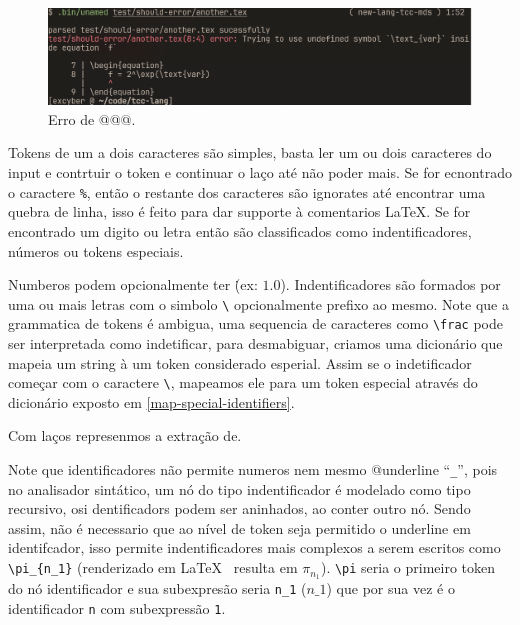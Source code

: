 \begin{figure}[H]
    \caption{\label{error-undefined-symbol} \small Erro de @@@.}
    \begin{center}
        \includegraphics[scale=0.5]{./Imagens/error-undefined-symbol.png}
    \end{center}
\end{figure}

Tokens de um a dois caracteres são simples, basta ler um ou dois caracteres do input e contrtuir o token e continuar o laço até não poder mais. Se for ecnontrado o caractere \texttt{\%}, então o restante dos caracteres são ignorates até encontrar uma quebra de linha, isso é feito para dar supporte à comentarios \LaTeX{}.
Se for encontrado um digito ou letra então são classificados como indentificadores, números ou tokens especiais.

Numberos podem opcionalmente ter \. (ex: $1.0$). Indentificadores são formados por uma ou mais letras com o simbolo \verb"\" opcionalmente prefixo ao mesmo. Note que a grammatica de tokens é ambigua, uma sequencia de caracteres como \verb"\frac" pode ser interpretada como indetificar, para desmabiguar, criamos uma dicionário que mapeia um string à um token considerado esperial. Assim se o indetificador começar com o caractere \verb"\", mapeamos ele para um token especial através do dicionário exposto em \autoref{map-special-identifiers}.

Com laços represenmos a extração de.

Note que identificadores não permite numeros nem mesmo @underline ``\verb|_|'', pois  no analisador sintático, um nó do tipo indentificador é modelado como tipo recursivo, osi dentificadors podem ser aninhados, ao  conter outro nó. Sendo assim, não é necessario que ao nível de token seja permitido o underline em identifcador, isso permite indentificadores mais complexos a serem escritos como \verb|\pi_{n_1}| (renderizado em \LaTeX{} \ resulta em $\pi_{n_1}$). \verb"\pi"  seria o primeiro token do nó identificador e sua subexpresão seria \verb"n_1" ($n\_1$) que por sua vez é o identificador \verb"n" com subexpressão \verb"1".


